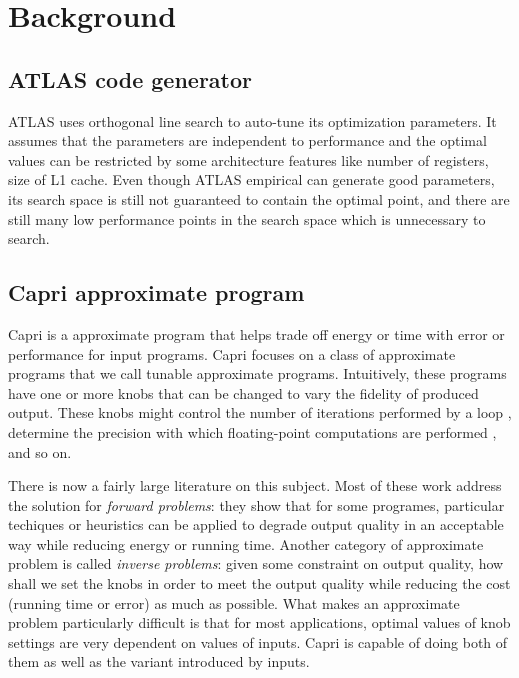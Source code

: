 \section{Background}
\label{sec:background}

  \subsection{ATLAS code generator}
  \label{sec:atlas_intro}
  ATLAS uses orthogonal line search to auto-tune its optimization parameters.
  It assumes that the parameters are independent to performance and the optimal values can be
  restricted by some architecture features like number of registers, size of L1 cache.
  Even though ATLAS empirical can generate good parameters, its search space is still not guaranteed to contain
  the optimal point, and there are still many low performance points in the search space which is unnecessary
  to search.

  \subsection{Capri approximate program}
  \label{sec:Capri_intro}
  Capri is a approximate program that helps trade off energy or time with error
  or performance for input programs. Capri focuses on a class of approximate
  programs that we call tunable approximate programs. Intuitively, these
  programs have one or more knobs that can be changed to vary the fidelity of
  produced output. These knobs might control the number of iterations performed
  by a loop \cite{bottou2010large, rinard2007using}, determine the precision with which floating-point
  computations are performed \cite{rubio2013precimonious, schkufza2014stochastic}, and so on.

  There is now a fairly large literature on this subject. Most of these work
  address the solution for \emph{forward problems}: they show that for some
  programes, particular techiques or heuristics can be applied to degrade
  output quality in an acceptable way while reducing energy or running time.
  Another category of approximate problem is called \emph{
  inverse problems}: given some constraint on output quality, how shall we set
  the knobs in order to meet the output quality while reducing the cost (running
  time or error) as much as possible. What makes an approximate problem
  particularly difficult is that for most applications, optimal values of
  knob settings are very dependent on values of inputs. Capri is capable of
  doing both of them as well as the variant introduced by inputs.

